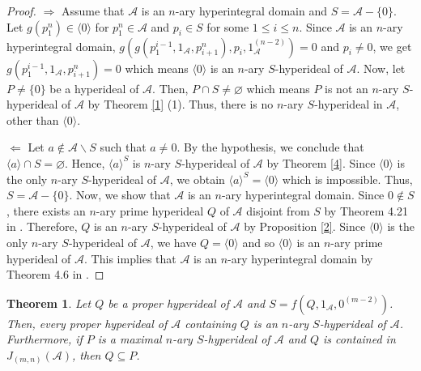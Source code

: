 \documentclass[preprint,review,10pt]{amsart}
\newtheorem{theorem}{Theorem}[section]
\theoremstyle{definition}
\theoremstyle{remark}
\numberwithin{equation}{section}
\begin{document}
\begin{proof}
 $\Longrightarrow$ Assume that $\mathscr{A}$ is an $n$-ary hyperintegral domain and $S=\mathscr{A}-\{0\}$. Let $g(p_1^n) \in \langle 0 \rangle$ for $p_1^n \in \mathscr{A}$ and $p_i \in S$ for some $1 \leq i \leq n$. Since  $\mathscr{A}$ is an $n$-ary hyperintegral domain,  $g(g(p_1^{i-1},1_\mathscr{A},p_{i+1}^n),p_i,1_\mathscr{A}^{(n-2)}) =0$ and $ p_i \neq 0$, we get $g(p_1^{i-1},1_\mathscr{A},p_{i+1}^n)=0$ which means $\langle 0 \rangle$ is an $n$-ary $S$-hyperideal of $\mathscr{A}$. Now, let $P \neq \{0\}$ be a  hyperideal of $\mathscr{A}$. Then, $P \cap S \neq \varnothing$ which means $P$ is not an $n$-ary $S$-hyperideal of $\mathscr{A}$ by Theorem \ref{1} (1). Thus, there is no $n$-ary $S$-hyperideal    in $\mathscr{A}$, other than $\langle 0 \rangle$.

$\Longleftarrow$ Let  $a \notin \mathscr{A} \backslash S$ such that $a \neq 0$. By the hypothesis, we conclude that $\langle a \rangle \cap S=\varnothing$. Hence, ${\langle a \rangle}^S$ is   $n$-ary $S$-hyperideal of $\mathscr{A}$ by Theorem \ref{4}. Since $\langle 0 \rangle$ is the only $n$-ary $S$-hyperideal of $\mathscr{A}$,  we obtain ${\langle a \rangle}^S=\langle 0 \rangle$ which is impossible. Thus, $S=\mathscr{A}-\{0\}$. Now, we show that $\mathscr{A}$ is an $n$-ary hyperintegral domain. Since $0 \notin S$, there exists an $n$-ary prime hyperideal $Q$ of $\mathscr{A}$ disjoint from $S$ by Theorem 4.21 in \cite{sorc1}. Therefore, $Q$ is an $n$-ary $S$-hyperideal of $\mathscr{A}$ by Proposition \ref{2}. Since $\langle 0 \rangle$ is the only $n$-ary $S$-hyperideal of $\mathscr{A}$, we have $Q=\langle 0 \rangle$ and so $\langle 0 \rangle$ is an $n$-ary prime hyperideal of $\mathscr{A}$. This implies that $\mathscr{A}$ is an $n$-ary hyperintegral domain by Theorem 4.6 in \cite{sorc1}. 
\end{proof}
\begin{theorem} \label{10}
Let $Q$ be a proper hyperideal of $\mathscr{A}$ and $S=f(Q,1_\mathscr{A},0^{(m-2)})$. Then, every proper hyperideal of $\mathscr{A}$ containing $Q$  is an $n$-ary $S$-hyperideal of $\mathscr{A}$. Furthermore, if $P$ is  a maximal   $n$-ary $S$-hyperideal  of $\mathscr{A}$ and $Q$ is contained in $J_{(m,n)}(\mathscr{A})$, then $Q \subseteq P$. 
\end{theorem}
\end{document}
